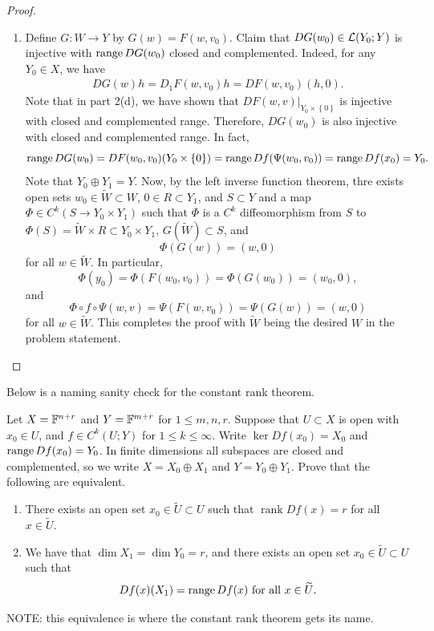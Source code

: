 \documentclass[a4paper]{article}
\begin{document}
\begin{proof}
{\begin{enumerate}
      \item Define $G : W \to Y$ by $G(w) = F(w, v_0)$. Claim that
            $DG(w_0) \in \mathcal{L}(Y_0; Y)$ is injective with $\operatorname{range} DG(w_0)$
            closed and complemented. Indeed, for any $Y_0 \in X$, we have
            \[
              \begin{aligned}
                DG(w)h = D_1 F(w, v_0)h = DF(w, v_0)(h, 0).
              \end{aligned}
            \]
            Note that in part 2(d), we have shown that $DF(w, v)
            \vert_{Y_0 \times \left\{ 0 \right\}}$ is injective with
            closed and complemented range. Therefore, $DG(w_0)$ is also
            injective with closed and complemented range. In fact,
            \[
              \operatorname{range} DG(w_0) = DF(w_0, v_0) (Y_0 \times \left\{ 0 \right\})
              = \operatorname{range} Df(\Psi(w_0, v_0)) = \operatorname{range} Df(x_0) = Y_0.
            \]
            Note that $Y_0 \oplus Y_1 = Y$. Now, by the left inverse
            function theorem, thre exists open sets $w_0 \in \tilde{W}
            \subset W$, $0 \in R \subset Y_1$, and $S \subset Y$ and a map
            $\Phi \in C^k(S \to Y_0 \times Y_1)$ such that $\Phi$ is a
            $C^k$ diffeomorphism from $S$ to $\Phi(S) = \tilde{W} \times R
            \subset Y_0 \times Y_1$, $G(\tilde{W}) \subset S$, and
            \[
              \Phi(G(w)) = (w, 0)
            \]
            for all $w \in \tilde{W}$. In particular,
            \[
              \Phi(y_0) = \Phi(F(w_0, v_0)) = \Phi(G(w_0)) = (w_0, 0),
            \]
            and
            \[
              \Phi \circ f \circ \Psi(w, v) = \Psi(F(w, v_0)) =
              \Psi(G(w)) = (w, 0)
            \]
            for all $w \in \tilde{W}$. This completes the proof with
            $\tilde{W}$ being the desired $W$ in the problem statement.
    \end{enumerate}

  }
\end{proof}

Below is a naming sanity check for the constant rank theorem.

\begin{thm}
  Let $X = \mathbb{F}^{n+r}$ and $Y = \mathbb{F}^{m+r}$ for $1\le m,n,r$. Suppose that $U
    \subset X$ is open with $x_0 \in U$, and $f \in C^k(U;Y)$ for $1 \le k
    \le \infty$. Write $\ker Df(x_0) = X_0$ and $\operatorname{range} Df(x_0) = Y_0$. In
  finite dimensions all subspaces are closed and complemented, so we write
  $X = X_0 \oplus X_1$ and $Y = Y_0 \oplus Y_1$. Prove that the following
  are equivalent.
  \begin{enumerate}
    \item There exists an open set $x_0 \in \tilde{U} \subset U$ such that
          $\operatorname{rank} Df(x) = r$ for all $x \in \tilde{U}$.
    \item We have that $\dim X_1 = \dim Y_0 = r$, and there exists an open
          set $x_0 \in \tilde{U} \subset U$ such that
          \[
            Df(x)(X_1) = \operatorname{range} Df(x) \text{ for all }x \in \widetilde{U}.
          \]
  \end{enumerate}
  NOTE: this equivalence is where the constant rank
  theorem gets its name.
\end{thm}
\end{document}
